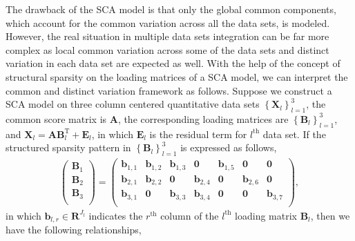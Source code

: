 The drawback of the SCA model is that only the global common components, which account for the common variation across all the data sets, is modeled. However, the real situation in multiple data sets integration can be far more complex as local common variation across some of the data sets and distinct variation in each data set are expected as well. With the help of the concept of structural sparsity on the loading matrices of a SCA model, we can interpret the common and distinct variation framework as follows. Suppose we construct a SCA model on three column centered quantitative data sets $\left\{\mathbf{X}_l \right\}_{l=1}^{3}$, the common score matrix is $\mathbf{A}$, the corresponding loading matrices are $\left\{\mathbf{B}_l \right\}_{l=1}^{3}$, and $\mathbf{X}_l = \mathbf{A}\mathbf{B}_{l}^{\text{T}} + \mathbf{E}_l$, in which $\mathbf{E}_l$ is the residual term for $l^{\text{th}}$ data set. If the structured sparsity pattern in $\left\{\mathbf{B}_l \right\}_{l=1}^{3}$ is expressed as follows,
\begin{equation*}
\begin{aligned}
   \left(
                 \begin{array}{c}
                   \mathbf{B}_1 \\
                   \mathbf{B}_2 \\
                   \mathbf{B}_3 \\
                 \end{array}
               \right)
               = \left(
                   \begin{array}{cccccccc}
                     \mathbf{b}_{1,1} & \mathbf{b}_{1,2} & \mathbf{b}_{1,3} & \mathbf{0}       & \mathbf{b}_{1,5} & \mathbf{0}       & \mathbf{0}      \\
                     \mathbf{b}_{2,1} & \mathbf{b}_{2,2} & \mathbf{0}       & \mathbf{b}_{2,4} & \mathbf{0}       & \mathbf{b}_{2,6} & \mathbf{0}       \\
                     \mathbf{b}_{3,1} & \mathbf{0}       & \mathbf{b}_{3,3} & \mathbf{b}_{3,4} & \mathbf{0}       & \mathbf{0}       & \mathbf{b}_{3,7} \\
                   \end{array}
                 \right),
\end{aligned}
\end{equation*}
in which $\mathbf{b}_{l,r} \in \mathbf{R}^{J_l}$ indicates the $r^{\text{th}}$ column of the $l^{\text{th}}$ loading matrix $\mathbf{B}_l$, then we have the following relationships,
